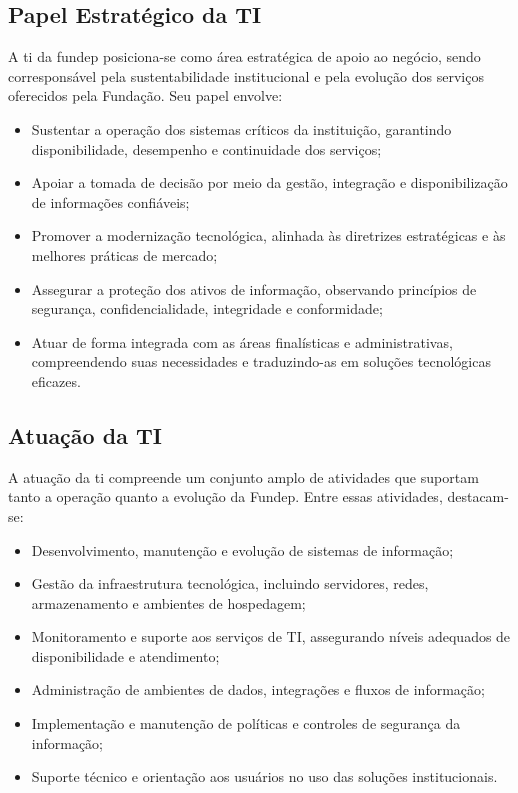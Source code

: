 \documentclass[12pt,a4paper]{article}
\begin{document}
\subsection{Papel Estratégico da TI}

A \gls{ti} da \gls{fundep} posiciona-se como área estratégica de apoio ao negócio, sendo corresponsável pela sustentabilidade institucional e pela evolução dos serviços oferecidos pela Fundação. Seu papel envolve:

\begin{itemize}
  \item Sustentar a operação dos sistemas críticos da instituição, garantindo disponibilidade, desempenho e continuidade dos serviços;
  \item Apoiar a tomada de decisão por meio da gestão, integração e disponibilização de informações confiáveis;
  \item Promover a modernização tecnológica, alinhada às diretrizes estratégicas e às melhores práticas de mercado;
  \item Assegurar a proteção dos ativos de informação, observando princípios de segurança, confidencialidade, integridade e conformidade;
  \item Atuar de forma integrada com as áreas finalísticas e administrativas, compreendendo suas necessidades e traduzindo-as em soluções tecnológicas eficazes.
\end{itemize}

\subsection{Atuação da TI}

A atuação da \gls{ti} compreende um conjunto amplo de atividades que suportam tanto a operação quanto a evolução da Fundep. Entre essas atividades, destacam-se:

\begin{itemize}
  \item Desenvolvimento, manutenção e evolução de sistemas de informação;
  \item Gestão da infraestrutura tecnológica, incluindo servidores, redes, armazenamento e ambientes de hospedagem;
  \item Monitoramento e suporte aos serviços de TI, assegurando níveis adequados de disponibilidade e atendimento;
  \item Administração de ambientes de dados, integrações e fluxos de informação;
  \item Implementação e manutenção de políticas e controles de segurança da informação;
  \item Suporte técnico e orientação aos usuários no uso das soluções institucionais.
\end{itemize}
\end{document}
